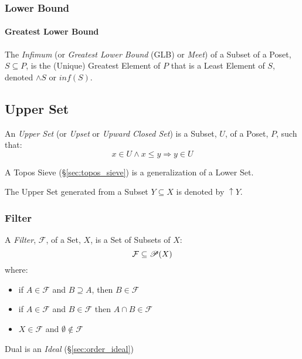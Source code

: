 \subsubsection{Lower Bound}\label{sec:lower_bound}

\paragraph{Greatest Lower Bound}\label{sec:greatest_lowerbound}\hfill

The \emph{Infimum} (or \emph{Greatest Lower Bound} (GLB) or
\emph{Meet}) of a Subset of a Poset, $S \subseteq P$, is the (Unique)
Greatest Element of $P$ that is a Least Element of $S$, denoted
$\wedge S$ or $inf (S)$.



\subsection{Upper Set}\label{sec:upper_set}

An \emph{Upper Set} (or \emph{Upset} or \emph{Upward Closed Set}) is a
Subset, $U$, of a Poset, $P$, such that:
\[
  x \in U \wedge x \leq y \Rightarrow y \in U
\]

A Topos Sieve (\S\ref{sec:topos_sieve}) is a generalization of a Lower
Set.

The Upper Set generated from a Subset $Y \subseteq X$ is denoted by
$\uparrow Y$.



\subsubsection{Filter}\label{sec:filter}

A \emph{Filter}, $\mathcal{F}$, of a Set, $X$, is a Set of Subsets of
$X$:
\[
  \mathcal{F} \subseteq \mathscr{P}(X)
\]
where:
\begin{itemize}
\item if $A \in \mathcal{F}$ and $B \supseteq A$, then $B \in
  \mathcal{F}$
\item if $A \in \mathcal{F}$ and $B \in \mathcal{F}$ then $A \cap B
  \in \mathcal{F}$
\item $X \in \mathcal{F}$ and $\emptyset \notin \mathcal{F}$
\end{itemize}

Dual is an \emph{Ideal} (\S\ref{sec:order_ideal})

